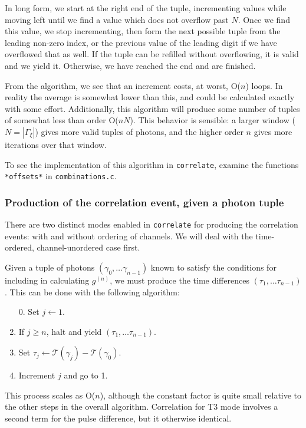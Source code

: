 \documentclass{article}
\newcommand{\correlate}{\texttt{correlate}}
\newcommand{\gn}[1]{\ensuremath{g^{(#1)}}}
\newcommand{\abs}[1]{\ensuremath{\left|#1\right|}}
\newcommand{\Time}{\ensuremath{\mathcal{T}}}
\newcommand{\photon}{\ensuremath{\gamma}}
\newcommand{\photons}{\ensuremath{\Gamma}}
\newcommand{\timewindow}{\ensuremath{\xi}}
\begin{document}
In long form, we start at the right end of the tuple, incrementing values while moving left until we find a value which does not overflow past $N$. Once we find this value, we stop incrementing, then form the next possible tuple from the leading non-zero index, or the previous value of the leading digit if we have overflowed that as well. If the tuple can be refilled without overflowing, it is valid and we yield it. Otherwise, we have reached the end and are finished.

From the algorithm, we see that an increment costs, at worst, O($n$) loops. In reality the average is somewhat lower than this, and could be calculated exactly with some effort. Additionally, this algorithm will produce some number of tuples of somewhat less than order O($nN$). This behavior is sensible: a larger window ($N=\abs{\photons_{\timewindow}}$) gives more valid tuples of photons, and the higher order $n$ gives more iterations over that window.

To see the implementation of this algorithm in \correlate, examine the functions \texttt{*offsets*} in \texttt{combinations.c}.

\subsubsection{Production of the correlation event, given a photon tuple}
There are two distinct modes enabled in \correlate{} for producing the correlation events: with and without ordering of channels. We will deal with the time-ordered, channel-unordered case first. 

Given a tuple of photons $(\photon_{0},\ldots\photon_{n-1})$ known to satisfy the conditions for including in calculating \gn{n}, we must produce the time differences $(\tau_{1}, \ldots\tau_{n-1})$. This can be done with the following algorithm:
\begin{enumerate}
\item[0.] Set $j\leftarrow 1$.
\item If $j\ge n$, halt and yield $(\tau_{1},\ldots\tau_{n-1})$.
\item Set $\tau_{j}\leftarrow \Time(\photon_{j}) - \Time(\photon_{0})$.
\item Increment $j$ and go to 1.
\end{enumerate}
This process scales as O($n$), although the constant factor is quite small relative to the other steps in the overall algorithm. Correlation for T3 mode involves a second term for the pulse difference, but it otherwise identical.
\end{document}
